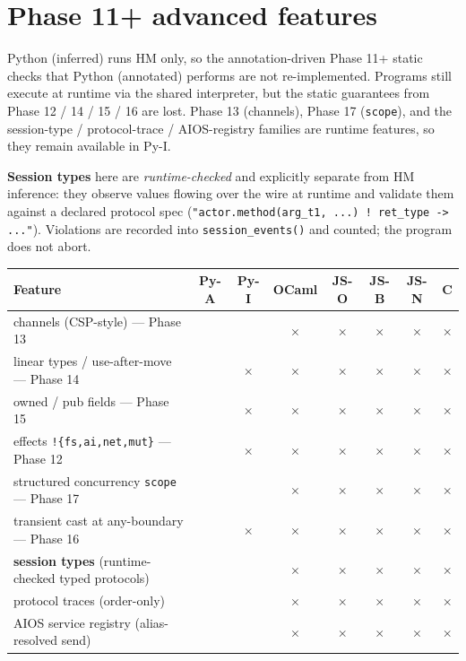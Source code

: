 \documentclass[10pt,a4paper,landscape]{article}
\newcommand{\Yes}{\textcolor{green!50!black}{\textbf{\checkmark}}}
\newcommand{\No}{\textcolor{red!70!black}{$\times$}}
\begin{document}
\section*{Phase 11+ advanced features}

Python (inferred) runs HM only, so the annotation-driven Phase 11+
static checks that Python (annotated) performs are not re-implemented.
Programs still execute at runtime via the shared interpreter, but
the static guarantees from Phase 12 / 14 / 15 / 16 are lost.
Phase 13 (channels), Phase 17 (\texttt{scope}), and the session-type /
protocol-trace / AIOS-registry families are runtime features, so
they remain available in Py-I.

\smallskip

\noindent
\textbf{Session types} here are \emph{runtime-checked} and explicitly
separate from HM inference: they observe values flowing over the
wire at runtime and validate them against a declared protocol spec
(\texttt{"actor.method(arg\_t1, ...) ! ret\_type -> ..."}).
Violations are recorded into \texttt{session\_events()} and counted;
the program does not abort.

\begin{longtable}{F C C C C C C C}
  \toprule
  \textbf{Feature} & \textbf{Py-A} & \textbf{Py-I} & \textbf{OCaml} & \textbf{JS-O} & \textbf{JS-B} & \textbf{JS-N} & \textbf{C} \\
  \midrule
  \endhead

  channels (CSP-style) — Phase 13          & \Yes & \Yes & \No & \No & \No & \No & \No \\
  linear types / use-after-move — Phase 14 & \Yes & \No  & \No & \No & \No & \No & \No \\
  owned / pub fields — Phase 15            & \Yes & \No  & \No & \No & \No & \No & \No \\
  effects \texttt{!\{fs,ai,net,mut\}} — Phase 12 & \Yes & \No  & \No & \No & \No & \No & \No \\
  structured concurrency \texttt{scope} — Phase 17 & \Yes & \Yes & \No & \No & \No & \No & \No \\
  transient cast at any-boundary — Phase 16 & \Yes & \No  & \No & \No & \No & \No & \No \\
  \textbf{session types} (runtime-checked typed protocols) & \Yes & \Yes & \No & \No & \No & \No & \No \\
  protocol traces (order-only)             & \Yes & \Yes & \No & \No & \No & \No & \No \\
  AIOS service registry (alias-resolved send) & \Yes & \Yes & \No & \No & \No & \No & \No \\
  \bottomrule
\end{longtable}
\end{document}
